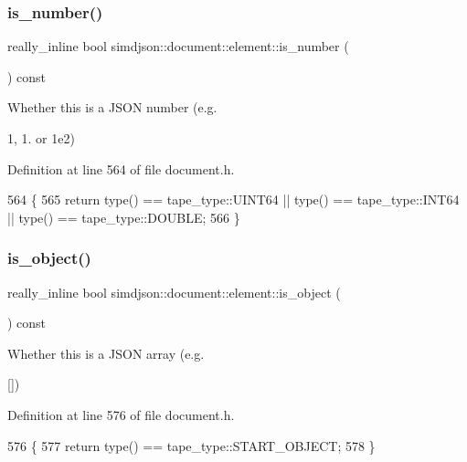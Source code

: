\subsubsection{\texorpdfstring{is\+\_\+number()}{is\_number()}}
{\footnotesize\ttfamily really\+\_\+inline bool simdjson\+::document\+::element\+::is\+\_\+number (\begin{DoxyParamCaption}{ }\end{DoxyParamCaption}) const\hspace{0.3cm}{\ttfamily [noexcept]}}



Whether this is a J\+S\+ON number (e.\+g. 

1, 1. or 1e2) 

Definition at line 564 of file document.\+h.


\begin{DoxyCode}
564                                                              \{
565   \textcolor{keywordflow}{return} type() == tape\_type::UINT64 || type() == tape\_type::INT64 || type() == tape\_type::DOUBLE;
566 \}
\end{DoxyCode}
\mbox{\label{classsimdjson_1_1document_1_1element_abd705b50a8571a6e36fe53c83133cd2b}} 
\subsubsection{\texorpdfstring{is\+\_\+object()}{is\_object()}}
{\footnotesize\ttfamily really\+\_\+inline bool simdjson\+::document\+::element\+::is\+\_\+object (\begin{DoxyParamCaption}{ }\end{DoxyParamCaption}) const\hspace{0.3cm}{\ttfamily [noexcept]}}



Whether this is a J\+S\+ON array (e.\+g. 

\mbox{[}\mbox{]}) 

Definition at line 576 of file document.\+h.


\begin{DoxyCode}
576                                                              \{
577   \textcolor{keywordflow}{return} type() == tape\_type::START\_OBJECT;
578 \}
\end{DoxyCode}
\mbox{\label{classsimdjson_1_1document_1_1element_ab50f025cf9a300e77d06c9bacd04c62a}} 
